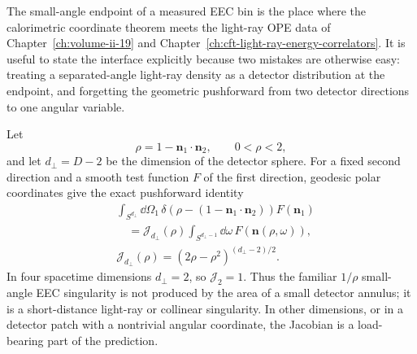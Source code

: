 \begin{controlledapproximation}
\label{ca:measured-small-angle-eec-endpoint-chart}
The small-angle endpoint of a measured EEC bin is the place where the
calorimetric coordinate theorem meets the light-ray OPE data of
Chapter~\ref{ch:volume-ii-19} and
Chapter~\ref{ch:cft-light-ray-energy-correlators}.  It is useful to state the
interface explicitly because two mistakes are otherwise easy: treating a
separated-angle light-ray density as a detector distribution at the endpoint,
and forgetting the geometric pushforward from two detector directions to one
angular variable.

Let
\[
  \rho=1-\mathbf n_1\cdot\mathbf n_2,\qquad 0<\rho<2,
\]
and let \(d_\perp=D-2\) be the dimension of the detector sphere.  For a fixed
second direction and a smooth test function \(F\) of the first direction,
geodesic polar coordinates give the exact pushforward identity
\begin{equation}
  \begin{aligned}
    &\int_{S^{d_\perp}}\dd\Omega_1\,
    \delta\!\left(\rho-(1-\mathbf n_1\cdot\mathbf n_2)\right)
    F(\mathbf n_1)\\
    &\quad =
    \mathcal J_{d_\perp}(\rho)
    \int_{S^{d_\perp-1}}\dd\omega\,
    F(\mathbf n(\rho,\omega)),\\
    &\mathcal J_{d_\perp}(\rho)
    =
    (2\rho-\rho^2)^{(d_\perp-2)/2}.
  \end{aligned}
  \label{eq:measured-small-angle-eec-pushforward}
\end{equation}
In four spacetime dimensions \(d_\perp=2\), so
\(\mathcal J_{2}=1\).  Thus the familiar \(1/\rho\) small-angle EEC
singularity is not produced by the area of a small detector annulus; it is a
short-distance light-ray or collinear singularity.  In other dimensions, or
in a detector patch with a nontrivial angular coordinate, the Jacobian is a
load-bearing part of the prediction.


\end{controlledapproximation}

